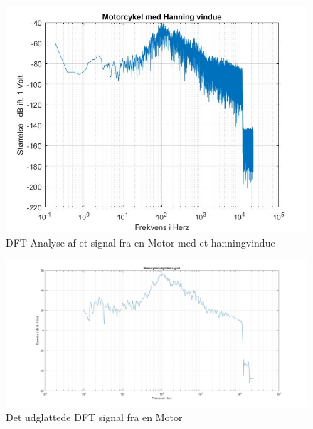 \begin{figure}[ht!]
	\centering
	\includegraphics[width=180mm]{figures/Motor/hanning.jpg}
	\caption{DFT Analyse af et signal fra en Motor med et hanningvindue}
	\label{fig:Motor hanning}
\end{figure}

\begin{figure}[ht!]
	\centering
	\includegraphics[width=180mm]{figures/Motor/udglattet.jpg}
	\caption{Det udglattede DFT signal fra en Motor}
	\label{fig:Motor udglattet}
\end{figure}

